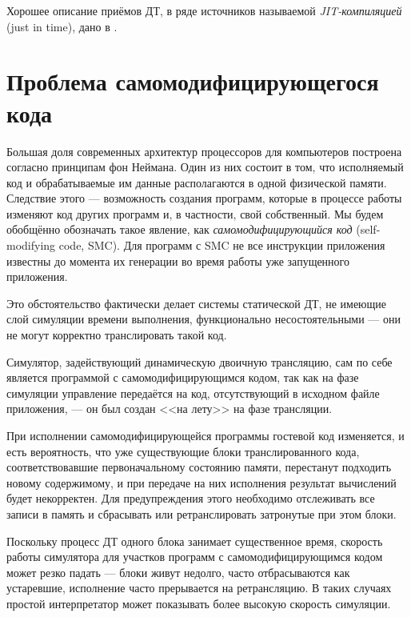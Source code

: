 Хорошее описание приёмов ДТ, в ряде источников называемой \textit{JIT-компиляцией} (\abbr just in time), дано в \cite{TophamJones2007}.


% 

\section{Проблема самомодифицирующегося кода}\label{sec:smc}

Большая доля современных архитектур процессоров для компьютеров построена согласно принципам фон Неймана. Один из них состоит в том, что исполняемый код и обрабатываемые им данные располагаются в одной физической памяти. Следствие этого --- возможность создания программ, которые в процессе работы изменяют код других программ и, в частности, свой собственный. Мы будем обобщённо обозначать такое явление, как \textit{самомодифицирующийся код} (\abbr self-modifying code, SMC). Для программ с SMC не все инструкции приложения известны до момента их генерации во время работы уже запущенного приложения.

Это обстоятельство фактически делает системы статической ДТ, не имеющие слой симуляции времени выполнения, функционально несостоятельными --- они не могут корректно транслировать такой код. 

\begin{digression}
Симулятор, задействующий динамическую двоичную трансляцию, сам по себе является программой с самомодифицирующимся кодом, так как на фазе симуляции управление передаётся на код, отсутствующий в исходном файле приложения, --- он был создан <<на лету>> на фазе трансляции.
\end{digression}

При исполнении самомодифицирующейся программы гостевой код изменяется, и есть вероятность, что уже существующие блоки транслированного кода, соответствовавшие первоначальному состоянию памяти, перестанут подходить новому содержимому, и при передаче на них исполнения результат вычислений будет некорректен.  Для предупреждения этого необходимо отслеживать все записи в память и сбрасывать или ретранслировать затронутые при этом блоки. 

Поскольку процесс ДТ одного блока занимает существенное время, скорость работы симулятора для участков программ с самомодифицирующимся кодом  может резко падать --- блоки живут недолго, часто отбрасываются как устаревшие, исполнение часто прерывается на ретрансляцию. В таких случаях простой интерпретатор может показывать более высокую скорость симуляции.

